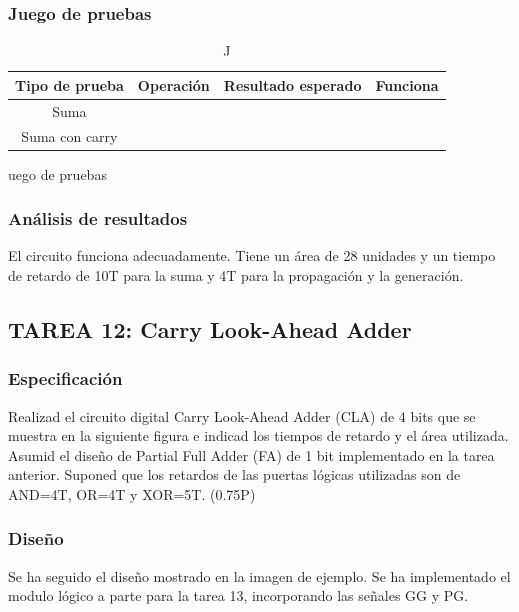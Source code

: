\documentclass{article}
\begin{document}
		\subsubsection*{Juego de pruebas}
		\begin{table}[h]
			\begin{center}
				\begin{tabular}{| c | c | c | c |}
					\hline
					Tipo de prueba & Operación & Resultado esperado & Funciona \\ \hline
					
					Suma & & & \\ \hline
					Suma con carry & & & \\ \hline
				\end{tabular}
				\caption Juego de pruebas
			\end{center}
		\end{table}



		\subsubsection*{Análisis de resultados}
		El circuito funciona adecuadamente. Tiene un área de 28 unidades y un tiempo de retardo de 10T para la suma y 4T para la propagación y la generación.

	\subsection{TAREA 12: Carry Look-Ahead Adder}
		\subsubsection*{Especificación}
		Realizad el circuito digital Carry Look-Ahead Adder (CLA) de 4 bits que se muestra en
la siguiente figura e indicad los tiempos de retardo y el área utilizada. Asumid el diseño de Partial
Full Adder (FA) de 1 bit implementado en la tarea anterior. Suponed que los retardos de las puertas
lógicas utilizadas son de AND=4T, OR=4T y XOR=5T. (0.75P)


		\subsubsection*{Diseño}
		Se ha seguido el diseño mostrado en la imagen de ejemplo. Se ha implementado el modulo lógico a parte para la tarea 13, incorporando las señales GG y PG.
\end{document}
